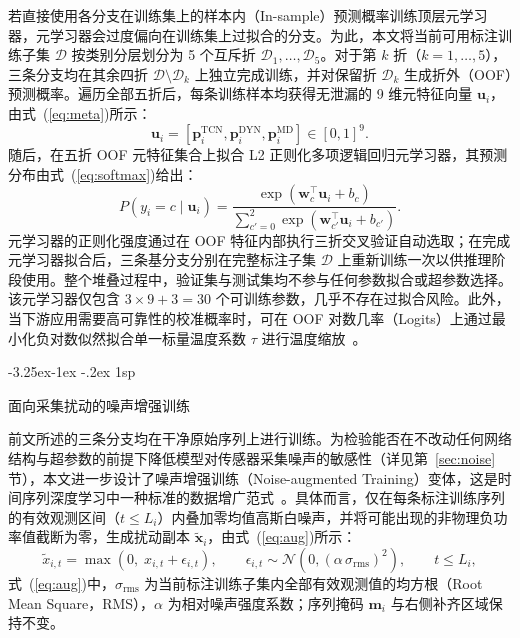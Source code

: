 \documentclass[12pt]{iopjournal}
\makeatletter
\renewcommand\subsection{\@startsection{subsection}{2}{\z@}%
                   {-3.25ex\@plus -1ex \@minus -.2ex}%
                   {1sp}%
                   {\reset@font\normalsize\bfseries\raggedright}}
\makeatother
\begin{document}
若直接使用各分支在训练集上的样本内（In-sample）预测概率训练顶层元学习器，元学习器会过度偏向在训练集上过拟合的分支。为此，本文将当前可用标注训练子集 $\mathcal{D}$ 按类别分层划分为 5 个互斥折 $\mathcal{D}_1,\ldots,\mathcal{D}_5$。对于第 $k$ 折（$k=1,\ldots,5$），三条分支均在其余四折 $\mathcal{D}\setminus\mathcal{D}_k$ 上独立完成训练，并对保留折 $\mathcal{D}_k$ 生成折外（OOF）预测概率。遍历全部五折后，每条训练样本均获得无泄漏的 9 维元特征向量 $\bm{u}_i$，由式~(\ref{eq:meta})所示：
\begin{equation}
\bm{u}_i=\left[\bm{p}_i^{\mathrm{TCN}},\bm{p}_i^{\mathrm{DYN}},\bm{p}_i^{\mathrm{MD}}\right]\in[0,1]^9.
\label{eq:meta}
\end{equation}
随后，在五折 OOF 元特征集合上拟合 L2 正则化多项逻辑回归元学习器，其预测分布由式~(\ref{eq:softmax})给出：
\begin{equation}
P(y_i=c\mid\bm{u}_i)=\frac{\exp(\bm{w}_c^{\top}\bm{u}_i+b_c)}{\sum_{c'=0}^{2}\exp(\bm{w}_{c'}^{\top}\bm{u}_i+b_{c'})}.
\label{eq:softmax}
\end{equation}
元学习器的正则化强度通过在 OOF 特征内部执行三折交叉验证自动选取；在完成元学习器拟合后，三条基分支分别在完整标注子集 $\mathcal{D}$ 上重新训练一次以供推理阶段使用。整个堆叠过程中，验证集与测试集均不参与任何参数拟合或超参数选择。该元学习器仅包含 $3\times 9+3=30$ 个可训练参数，几乎不存在过拟合风险。此外，当下游应用需要高可靠性的校准概率时，可在 OOF 对数几率（Logits）上通过最小化负对数似然拟合单一标量温度系数 $\tau$ 进行温度缩放~\cite{guo2017}。

\subsection{面向采集扰动的噪声增强训练}\label{sec:aug}

前文所述的三条分支均在干净原始序列上进行训练。为检验能否在不改动任何网络结构与超参数的前提下降低模型对传感器采集噪声的敏感性（详见第~\ref{sec:noise} 节），本文进一步设计了噪声增强训练（Noise-augmented Training）变体，这是时间序列深度学习中一种标准的数据增广范式~\cite{wen2021}。具体而言，仅在每条标注训练序列的有效观测区间（$t\le L_i$）内叠加零均值高斯白噪声，并将可能出现的非物理负功率值截断为零，生成扰动副本 $\tilde{\bm{x}}_i$，由式~(\ref{eq:aug})所示：
\begin{equation}
\tilde{x}_{i,t}=\max\!\left(0,\;x_{i,t}+\epsilon_{i,t}\right),\qquad \epsilon_{i,t}\sim\mathcal{N}\!\left(0,(\alpha\,\sigma_{\mathrm{rms}})^2\right),\qquad t\le L_i,
\label{eq:aug}
\end{equation}
式~(\ref{eq:aug})中，$\sigma_{\mathrm{rms}}$ 为当前标注训练子集内全部有效观测值的均方根（Root Mean Square，RMS），$\alpha$ 为相对噪声强度系数；序列掩码 $\bm{m}_i$ 与右侧补齐区域保持不变。
\end{document}
